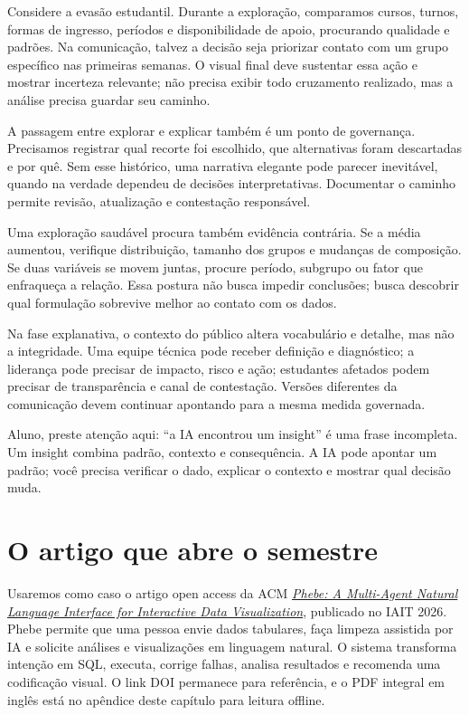 Considere a evasão estudantil. Durante a exploração, comparamos cursos, turnos, formas de ingresso, períodos e disponibilidade de apoio, procurando qualidade e padrões. Na comunicação, talvez a decisão seja priorizar contato com um grupo específico nas primeiras semanas. O visual final deve sustentar essa ação e mostrar incerteza relevante; não precisa exibir todo cruzamento realizado, mas a análise precisa guardar seu caminho.

A passagem entre explorar e explicar também é um ponto de governança. Precisamos registrar qual recorte foi escolhido, que alternativas foram descartadas e por quê. Sem esse histórico, uma narrativa elegante pode parecer inevitável, quando na verdade dependeu de decisões interpretativas. Documentar o caminho permite revisão, atualização e contestação responsável.

Uma exploração saudável procura também evidência contrária. Se a média aumentou, verifique distribuição, tamanho dos grupos e mudanças de composição. Se duas variáveis se movem juntas, procure período, subgrupo ou fator que enfraqueça a relação. Essa postura não busca impedir conclusões; busca descobrir qual formulação sobrevive melhor ao contato com os dados.

Na fase explanativa, o contexto do público altera vocabulário e detalhe, mas não a integridade. Uma equipe técnica pode receber definição e diagnóstico; a liderança pode precisar de impacto, risco e ação; estudantes afetados podem precisar de transparência e canal de contestação. Versões diferentes da comunicação devem continuar apontando para a mesma medida governada.

\begin{GuidedBox}
Aluno, preste atenção aqui: ``a IA encontrou um insight'' é uma frase incompleta. Um insight combina padrão, contexto e consequência. A IA pode apontar um padrão; você precisa verificar o dado, explicar o contexto e mostrar qual decisão muda.
\end{GuidedBox}

\section{O artigo que abre o semestre}

Usaremos como caso o artigo open access da ACM \href{https://doi.org/10.1145/3816713.3819784}{\textit{Phebe: A Multi-Agent Natural Language Interface for Interactive Data Visualization}}, publicado no IAIT 2026. Phebe permite que uma pessoa envie dados tabulares, faça limpeza assistida por IA e solicite análises e visualizações em linguagem natural. O sistema transforma intenção em SQL, executa, corrige falhas, analisa resultados e recomenda uma codificação visual. O link DOI permanece para referência, e o PDF integral em inglês está no apêndice deste capítulo para leitura offline.

